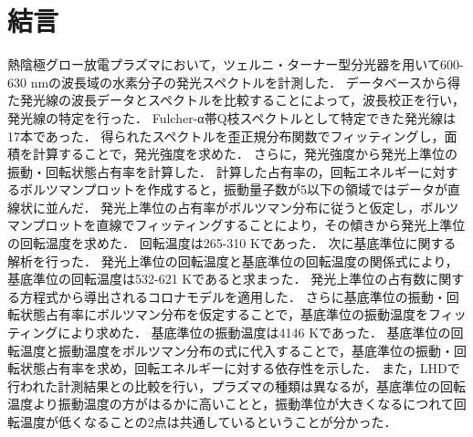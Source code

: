 \chapter{結言}

熱陰極グロー放電プラズマにおいて，ツェルニ・ターナー型分光器を用いて600-630 nmの波長域の水素分子の発光スペクトルを計測した．
データベースから得た発光線の波長データとスペクトルを比較することによって，波長校正を行い，発光線の特定を行った．
Fulcher-α帯Q枝スペクトルとして特定できた発光線は17本であった．
得られたスペクトルを歪正規分布関数でフィッティングし，面積を計算することで，発光強度を求めた．
さらに，発光強度から発光上準位の振動・回転状態占有率を計算した．
計算した占有率の，回転エネルギーに対するボルツマンプロットを作成すると，振動量子数が5以下の領域ではデータが直線状に並んだ．
発光上準位の占有率がボルツマン分布に従うと仮定し，ボルツマンプロットを直線でフィッティングすることにより，その傾きから発光上準位の回転温度を求めた．
回転温度は265-310 Kであった．
次に基底準位に関する解析を行った．
発光上準位の回転温度と基底準位の回転温度の関係式により，基底準位の回転温度は532-621 Kであると求まった．
発光上準位の占有数に関する方程式から導出されるコロナモデルを適用した．
さらに基底準位の振動・回転状態占有率にボルツマン分布を仮定することで，基底準位の振動温度をフィッティングにより求めた．
基底準位の振動温度は4146 Kであった．
基底準位の回転温度と振動温度をボルツマン分布の式に代入することで，基底準位の振動・回転状態占有率を求め，回転エネルギーに対する依存性を示した．
また，LHDで行われた計測結果との比較を行い，プラズマの種類は異なるが，基底準位の回転温度より振動温度の方がはるかに高いことと，振動準位が大きくなるにつれて回転温度が低くなることの2点は共通しているということが分かった．